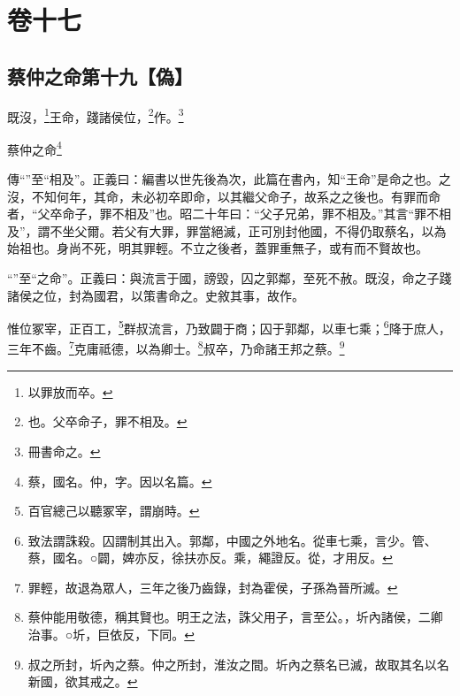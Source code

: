 

\chapter{卷十七}


\section{蔡仲之命第十九【偽】}


既沒，\footnote{以罪放而卒。}王命，踐諸侯位，\footnote{也。父卒命子，罪不相及。}作。\footnote{冊書命之。}

蔡仲之命\footnote{蔡，國名。仲，字。因以名篇。}


{\noindent\zhuan{}\fzbyks 傳“”至“相及”。正義曰：編書以世先後為次，此篇在書內，知“王命”是命之也。之沒，不知何年，其命，未必初卒即命，以其繼父命子，故系之之後也。有罪而命者，“父卒命子，罪不相及”也。昭二十年曰：“父子兄弟，罪不相及。”其言“罪不相及”，謂不坐父爾。若父有大罪，罪當絕滅，正可別封他國，不得仍取蔡名，以為始祖也。身尚不死，明其罪輕。不立之後者，蓋罪重無子，或有而不賢故也。 \par}

{\noindent\shu{}\fzkt “”至“之命”。正義曰：與流言于國，謗毀，囚之郭鄰，至死不赦。既沒，命之子踐諸侯之位，封為國君，以策書命之。史敘其事，故作。 \par}

惟位冢宰，正百工，\footnote{百官總己以聽冢宰，謂崩時。}群叔流言，乃致闢于商；囚于郭鄰，以車七乘；\footnote{致法謂誅殺。囚謂制其出入。郭鄰，中國之外地名。從車七乘，言少。管、蔡，國名。○闢，婢亦反，徐扶亦反。乘，繩證反。從，才用反。}降于庶人，三年不齒。\footnote{罪輕，故退為眾人，三年之後乃齒錄，封為霍侯，子孫為晉所滅。}克庸祗德，以為卿士。\footnote{蔡仲能用敬德，稱其賢也。明王之法，誅父用子，言至公。，圻內諸侯，二卿治事。○圻，巨依反，下同。}叔卒，乃命諸王邦之蔡。\footnote{叔之所封，圻內之蔡。仲之所封，淮汝之間。圻內之蔡名已滅，故取其名以名新國，欲其戒之。}


